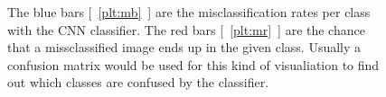 \begin{figure}[h!t]
\newcommand{\plotref}[1]{{[~\ref{plt:#1}~]}}
\centering
\caption{The  blue bars \plotref{mb} are the misclassification rates per class with the CNN classifier. The red bars \plotref{mr} are the chance that a missclassified image ends up in the given class. Usually a confusion matrix would be used for this kind of visualiation to find out which classes are confused by the classifier.} %
\label{fig:missrate}

\end{figure}



